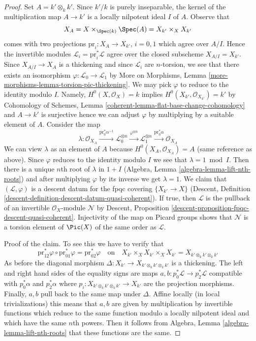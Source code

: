 \begin{proof}
\medskip\noindent
Set $A = k' \otimes_k k'$. Since $k'/k$ is purely inseparable,
the kernel of the multiplication map $A \to k'$ is a
locally nilpotent ideal $I$ of $A$. Observe that
$$
X_A = X \times_{\Spec(k)} \Spec(A) = X_{k'} \times_X X_{k'}
$$
comes with two projections $\text{pr}_i : X_A \to X_{k'}$, $i = 0, 1$
which agree over $A/I$. Hence the invertible modules
$\mathcal{L}_i = \text{pr}_i^*\mathcal{L}$
agree over the closed subscheme $X_{A/I} = X_{k'}$.
Since $X_{A/I} \to X_A$ is a thickening and since
$\mathcal{L}_i$ are $n$-torsion, we see that there
exists an isomorphism $\varphi : \mathcal{L}_0 \to \mathcal{L}_1$ by
More on Morphisms, Lemma \ref{more-morphisms-lemma-torsion-pic-thickening}.
We may pick $\varphi$ to reduce to the identity modulo $I$. Namely,
$H^0(X, \mathcal{O}_X) = k$ implies
$H^0(X_{k'}, \mathcal{O}_{X_{k'}}) = k'$ by
Cohomology of Schemes, Lemma \ref{coherent-lemma-flat-base-change-cohomology}
and $A \to k'$ is surjective hence we can adjust $\varphi$ by multiplying by
a suitable element of $A$. Consider the map
$$
\lambda : \mathcal{O}_{X_A}
\xrightarrow{\text{pr}_0^*\alpha^{-1}}
\mathcal{L}_0^{\otimes n}
\xrightarrow{\varphi^{\otimes n}}
\mathcal{L}_1^{\otimes n}
\xrightarrow{\text{pr}_0^*\alpha}
\mathcal{O}_{X_A}
$$
We can view $\lambda$ as an element of $A$ because
$H^0(X_A, \mathcal{O}_{X_A}) = A$ (same reference as above).
Since $\varphi$ reduces to the identity modulo $I$ we
see that $\lambda = 1 \bmod I$. Then there is a unique
$n$th root of $\lambda$ in $1 + I$
(Algebra, Lemma \ref{algebra-lemma-lift-nth-roots})
and after multiplying $\varphi$ by its inverse we get $\lambda = 1$.
We claim that $(\mathcal{L}, \varphi)$ is a descent datum
for the fpqc covering $\{X_{k'} \to X\}$
(Descent, Definition \ref{descent-definition-descent-datum-quasi-coherent}).
If true, then $\mathcal{L}$ is the pullback of an invertible
$\mathcal{O}_X$-module $\mathcal{N}$ by
Descent, Proposition \ref{descent-proposition-fpqc-descent-quasi-coherent}.
Injectivity of the map on Picard groups shows that $\mathcal{N}$
is a torsion element of $\Pic(X)$ of the same order as $\mathcal{L}$.

\medskip\noindent
Proof of the claim. To see this we have to verify that
$$
\text{pr}_{12}^*\varphi \circ
\text{pr}_{01}^*\varphi =
\text{pr}_{02}^*\varphi
\quad\text{on}\quad
X_{k'} \times_X X_{k'} \times_X X_{k'} = X_{k' \otimes_k k' \otimes_k k'}
$$
As before the diagonal morphism
$\Delta : X_{k'} \to X_{k' \otimes_k k' \otimes_k k'}$
is a thickening. The left and right hand sides of the equality signs
are maps $a, b : p_0^*\mathcal{L} \to p_2^*\mathcal{L}$ compatible with
$p_0^*\alpha$ and $p_2^*\alpha$ where
$p_i : X_{k' \otimes_k k' \otimes_k k'} \to X_{k'}$
are the projection morphisms. Finally, $a, b$ pull back to the
same map under $\Delta$.
Affine locally (in local trivializations) this means that
$a, b$ are given by multiplication by invertible functions
which reduce to the same function modulo a locally nilpotent
ideal and which have the same $n$th powers. Then it follows
from Algebra, Lemma \ref{algebra-lemma-lift-nth-roots}
that these functions are the same.
\end{proof}




